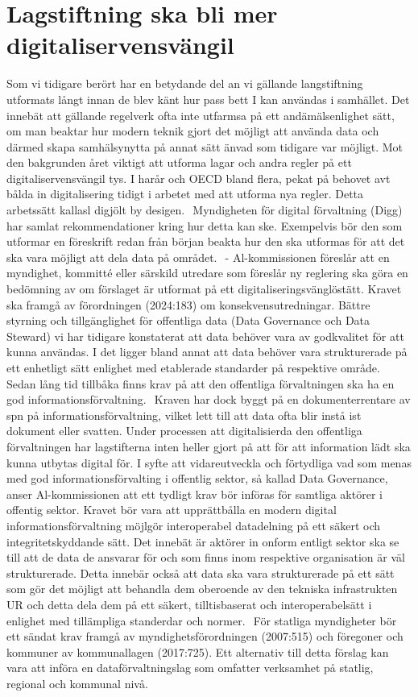 {{\section*{Lagstiftning ska bli mer digitaliservensvängil} Som vi tidigare berört har en betydande del an vi gällande langstiftning utformats långt innan de blev känt hur pass bett I kan användas i samhället.
Det innebät att gällande regelverk ofta inte utfarmsa på ett andämälsenlighet sätt, om man beaktar hur modern teknik gjort det möjligt att använda data och därmed skapa samhälsynytta på annat sätt änvad som tidigare var möjligt. Mot den bakgrunden året viktigt att utforma lagar och andra regler på ett digitaliservensvängil tys. I harår och OECD bland flera, pekat på behovet avt bålda in digitalisering tidigt i arbetet med att utforma nya regler. Detta arbetssätt kallasl digjölt by desigen. \({ }^{}\)
Myndigheten för digital förvaltning (Digg) har samlat rekommendationer kring hur detta kan ske. Exempelvis bör den som utformar en föreskrift redan från början beakta hur den ska utformas för att det ska vara möjligt att dela data på området. \({ }^{}\)
- Al-kommissionen föreslår att en myndighet, kommitté eller särskild utredare som föreslår ny reglering ska göra en bedömning av om förslaget är utformat på ett digitaliseringsvänglöstätt.
Kravet ska framgå av förordningen (2024:183) om konsekvensutredningar.
Bättre styrning och tillgänglighet för offentliga data (Data Governance och Data Steward)
vi har tidigare konstaterat att data behöver vara av godkvalitet för att kunna användas. I det ligger bland annat att data behöver vara strukturerade på ett enhetligt sätt enlighet med etablerade standarder på respektive område. Sedan lång tid tillbåka finns krav på att den offentliga förvaltningen ska ha en god informationsförvaltning. \({ }^{}\) Kraven har dock byggt på en dokumenterrentare av spn på informationsförvaltning, vilket lett till att data ofta blir instå ist dokument eller svatten. Under processen att digitalisierda den offentliga förvaltningen har lagstifterna inten heller gjort på att för att information lädt ska kunna utbytas digital för.
I syfte att vidareutveckla och förtydliga vad som menas med god informationsförvalting i offentlig sektor, så kallad Data Governance, anser Al-kommissionen att ett tydligt krav bör införas för samtliga aktörer i offentig sektor. Kravet bör vara att upprättbålla en modern digital informationsförvaltning möjlgör interoperabel datadelning på ett säkert och integritetskyddande sätt. Det innebät är aktörer in onform entligt sektor ska se till att de data de ansvarar för och som finns inom respektive organisation är väl strukturerade. Detta innebär också att data ska vara strukturerade på ett sätt som gör det möjligt att behandla dem oberoende av den tekniska infrastrukten UR och detta dela dem på ett säkert, tilltisbaserat och interoperabelsätt i enlighet med tillämpliga standerdar och normer. \({ }^{}\) För statliga myndigheter bör ett sändat krav framgå av myndighetsförordningen (2007:515) och föregoner och kommuner av kommunallagen (2017:725). Ett alternativ till detta förslag kan vara att införa en dataförvaltningslag som omfatter verksamhet på statlig, regional och kommunal nivå.
}}
